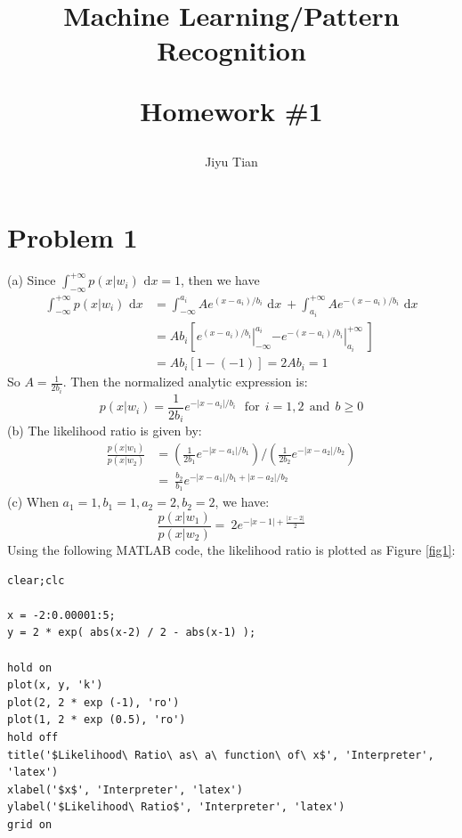 \documentclass[12pt]{article}
\title{Machine Learning/Pattern Recognition\\  \begin{Large} Homework \#1 \end{Large} }
\author{Jiyu Tian}
\date{}
\begin{document}
\maketitle
\section{Problem 1}
(a) Since $\int_{-\infty}^{+\infty} p(x|w_i) \text{ d}x =1$, then we have
\begin{equation*}
\begin{aligned}
\int_{-\infty}^{+\infty} p(x|w_i) \text{ d}x &=\int_{-\infty}^{a_i} A e^{(x-a_i)/b_i} \text{ d}x \ + \int_{a_i}^{+\infty} A e^{-(x-a_i)/b_i} \text{ d}x \\ 
&=Ab_i[\left.e^{(x-a_i)/b_i} \right|^{a_i} _{-\infty} \left.-e^{-(x-a_i)/b_i} \right|^{+\infty} _{a_i} \ ]\\
&=Ab_i[1-(-1)]=2Ab_i=1
\end{aligned}
\end{equation*}
So $A=\frac{1}{2b_i}$. Then the normalized analytic expression is:
\begin{equation*}
p(x|w_i)=\frac{1}{2b_i} e^{-|x-a_i|/b_i}\ \ \  \text{for}\ \  i=1,2 \ \  \text{and} \ \ b\geq 0
\end{equation*}
(b) The likelihood ratio is given by:
\begin{equation*}
\begin{aligned}
\frac {p(x|w_1)}{p(x|w_2)} &=(\frac{1}{2b_1} e^{-|x-a_1|/b_1})/(\frac{1}{2b_2} e^{-|x-a_2|/b_2})\\
&= \ \frac{b_2}{b_1} e^{-|x-a_1|/b_1+|x-a_2|/b_2}
\end{aligned}
\end{equation*}
(c) When $a_1=1,b_1=1,a_2=2,b_2=2$, we have:
\begin{equation*}
\frac {p(x|w_1)}{p(x|w_2)}=\ 2e^{-|x-1|+\frac{|x-2|}{2}} 
\end{equation*}
Using the following MATLAB code, the likelihood ratio is plotted as Figure \ref{fig1}:
\begin{lstlisting}
clear;clc

x = -2:0.00001:5;
y = 2 * exp( abs(x-2) / 2 - abs(x-1) );

hold on
plot(x, y, 'k')
plot(2, 2 * exp (-1), 'ro')
plot(1, 2 * exp (0.5), 'ro')
hold off
title('$Likelihood\ Ratio\ as\ a\ function\ of\ x$', 'Interpreter', 'latex')
xlabel('$x$', 'Interpreter', 'latex')
ylabel('$Likelihood\ Ratio$', 'Interpreter', 'latex')
grid on
\end{lstlisting}
\end{document}
